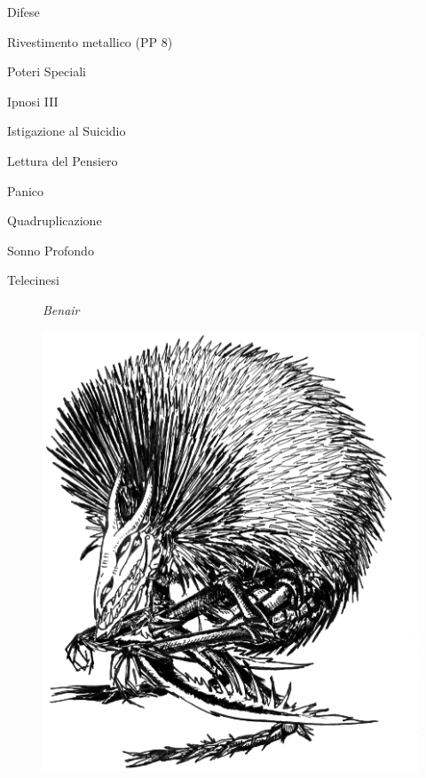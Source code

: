 \begin{parmostro}{Difese}
\item  Rivestimento metallico (PP 8)
\end{parmostro}

\begin{parmostro}{Poteri Speciali}
\item Ipnosi III
\item Istigazione al Suicidio
\item Lettura del Pensiero
\item Panico
\item Quadruplicazione
\item Sonno Profondo
\item Telecinesi
\end{parmostro}


\begin{figure}[bth]
\begin{center}
{\it Benair}\par\bigskip
\includegraphics{benahir.eps}
\end{center}
\end{figure}


